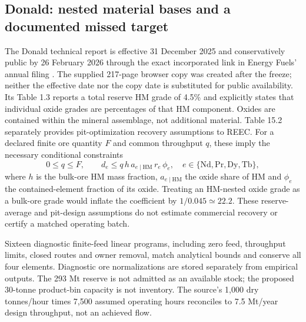 \documentclass[11pt]{article}
\begin{document}
\subsection{Donald: nested material bases and a documented missed target}
The Donald technical report is effective 31 December 2025 and conservatively public by 26 February 2026 through the exact incorporated link in Energy Fuels' annual filing \citep{DonaldTRS2026,EF2025}. The supplied 217-page browser copy was created after the freeze; neither the effective date nor the copy date is substituted for public availability. Its Table 1.3 reports a total reserve HM grade of 4.5\% and explicitly states that individual oxide grades are percentages of that HM component. Oxides are contained within the mineral assemblage, not additional material. Table 15.2 separately provides pit-optimization recovery assumptions to REEC. For a declared finite ore quantity $F$ and common throughput $q$, these imply the necessary conditional constraints
\[
 0\le q\le F,\qquad
 d_e\le q\,h\,a_{e\mid\mathrm{HM}}\,r_e\,\phi_e,
 \quad e\in\{\mathrm{Nd,Pr,Dy,Tb}\},
\]
where $h$ is the bulk-ore HM mass fraction, $a_{e\mid\mathrm{HM}}$ the oxide share of HM and $\phi_e$ the contained-element fraction of its oxide. Treating an HM-nested oxide grade as a bulk-ore grade would inflate the coefficient by $1/0.045\simeq22.2$. These reserve-average and pit-design assumptions do not estimate commercial recovery or certify a matched operating batch.
\begin{table}[htbp]\centering\small

\caption{Donald conditional reserve/pit-design coefficients. Common HM grade is 4.5\%; source recovery assumptions stop at mine concentrate. Source precision limits interpretation of derived digits. No available ore, downstream separated output or magnet service is estimated.}\label{tab:donald}
\end{table}

Sixteen diagnostic finite-feed linear programs, including zero feed, throughput limits, closed routes and owner removal, match analytical bounds and conserve all four elements. Diagnostic ore normalizations are stored separately from empirical outputs. The 293 Mt reserve is not admitted as an available stock; the proposed 30-tonne product-bin capacity is not inventory. The source's 1,000 dry tonnes/hour times 7,500 assumed operating hours reconciles to 7.5 Mt/year design throughput, not an achieved flow.
\end{document}

